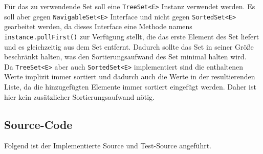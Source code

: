 \documentclass[11pt, a4paper, twoside]{article}   	%
\newcommand{\srcDir}{../src/main/java}
\newcommand{\srcTestDir}{../src/test/java}
\newcommand{\mainPackage}{\srcDir/at/fhooe/swe4/lab3}
\newcommand{\mainTestPackage}{\srcTestDir/at/fhooe/swe4/lab3/test}
\newcommand{\sourceSection}{Source-Code}
\newcommand{\inlinecode}{\lstinline[style=inlineSource]}
\begin{document}
Für das zu verwendende Set soll eine \inlinecode{TreeSet<E>}
Instanz verwendet werden. Es soll aber gegen \inlinecode{NavigableSet<E>} Interface und nicht gegen \inlinecode{SortedSet<E>} gearbeitet werden, da dieses Interface eine Methode namens \inlinecode{instance.pollFirst()} zur Verfügung stellt, die das erste Element des Set liefert und es gleichzeitig aus dem Set entfernt. Dadurch sollte das Set in seiner Größe beschränkt halten, was den Sortierungsaufwand des Set minimal halten wird.\\
Da \inlinecode{TreeSet<E>} aber auch \inlinecode{SortedSet<E>} implementiert sind die enthaltenen Werte implizit immer sortiert und dadurch auch die Werte in der resultierenden Liste, da die hinzugefügten Elemente immer sortiert eingefügt werden. Daher ist hier kein zusätzlicher Sortierungsaufwand nötig.
\newpage
\subsection{\sourceSection}
Folgend ist der Implementierte Source und Test-Source angeführt.


\newpage
\end{document}
